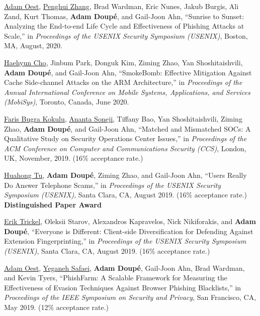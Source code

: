 \documentclass[11pt,letterpaper,sans]{moderncv}
\begin{document}
\begin{etaremune}

\item \underline{Adam Oest}, \underline{Penghui Zhang}, Brad Wardman, Eric Nunes, Jakub Burgis, Ali Zand, Kurt Thomas, \textbf{Adam Doup\'e}, and Gail-Joon Ahn, ``Sunrise to Sunset: Analyzing the End-to-end Life Cycle and Effectiveness of Phishing Attacks at Scale,'' in \emph{Proceedings of the USENIX Security Symposium (USENIX)}, Boston, MA, August, 2020.

\item \underline{Haehyun Cho}, Jinbum Park, Donguk Kim, Ziming Zhao, Yan Shoshitaishvili, \textbf{Adam Doup\'e}, and Gail-Joon Ahn, ``SmokeBomb: Effective Mitigation Against Cache Side-channel Attacks on the ARM Architecture,'' in \emph{Proceedings of the Annual International Conference on Mobile Systems, Applications, and Services (MobiSys)}, Toronto, Canada, June 2020.

\item \underline{Faris Bugra Kokulu}, \underline{Ananta Soneji}, Tiffany Bao, Yan Shoshitaishvili, Ziming Zhao, \textbf{Adam Doup\'e}, and Gail-Joon Ahn, ``Matched and Mismatched SOCs: A Qualitative Study on Security Operations Center Issues,'' in \emph{Proceedings of the ACM Conference on Computer and Communications Security (CCS)}, London, UK, November, 2019. (16\% acceptance rate.)

\item \underline{Huahong Tu}, \textbf{Adam Doup\'e}, Ziming Zhao, and Gail-Joon Ahn, ``Users Really Do Answer Telephone Scams,'' in \emph{Proceedings of the USENIX Security Symposium (USENIX)}, Santa Clara, CA, August 2019. (16\% acceptance rate.) \\
  \textbf{Distinguished Paper Award}

\item \underline{Erik Trickel}, Oleksii Starov, Alexandros Kapravelos, Nick Nikiforakis, and \textbf{Adam Doup\'e}, ``Everyone is Different: Client-side Diversification for Defending Against Extension Fingerprinting,'' in \emph{Proceedings of the USENIX Security Symposium (USENIX)}, Santa Clara, CA, August 2019. (16\% acceptance rate.)

\item \underline{Adam Oest}, \underline{Yeganeh Safaei}, \textbf{Adam Doup\'e}, Gail-Joon Ahn, Brad Wardman, and Kevin Tyers, ``PhishFarm: A Scalable Framework for Measuring the Effectiveness of Evasion Techniques Against Browser Phishing Blacklists,'' in \emph{Proceedings of the IEEE Symposium on Security and Privacy}, San Francisco, CA, May 2019. (12\% acceptance rate.)


\end{etaremune}
\end{document}
